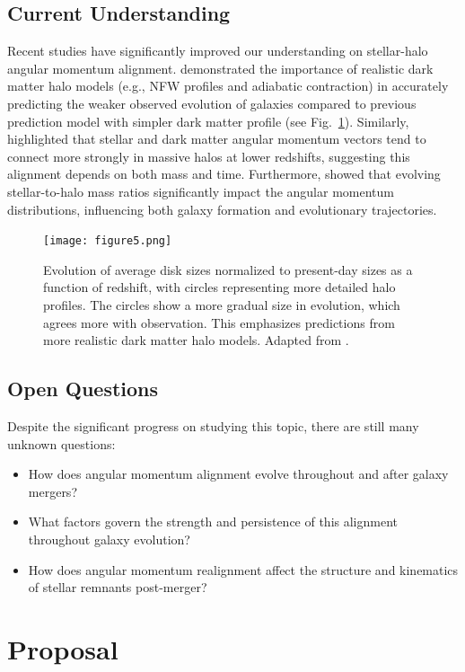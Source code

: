 \documentclass[twocolumn]{aastex631}
\begin{document}
\subsection{Current Understanding}
Recent studies have significantly improved our understanding on stellar-halo angular momentum alignment. \cite{Somerville2008} demonstrated the importance of realistic dark matter halo models (e.g., NFW profiles and adiabatic contraction) in accurately predicting the weaker observed evolution of galaxies compared to previous prediction model with simpler dark matter profile (see Fig.~\ref{fig:somerville_fig5}). Similarly, \cite{Chua2019} highlighted that stellar and dark matter angular momentum vectors tend to connect more strongly in massive halos at lower redshifts, suggesting this alignment depends on both mass and time. Furthermore, \cite{Baptista2023} showed that evolving stellar-to-halo mass ratios significantly impact the angular momentum distributions, influencing both galaxy formation and evolutionary trajectories.

\begin{figure}[ht!]
    \centering
    \texttt{[image: figure5.png]}
    \caption{Evolution of average disk sizes normalized to present-day sizes as a function of redshift, with circles representing more detailed halo profiles. The circles show a more gradual size in evolution, which agrees more with observation. This emphasizes predictions from more realistic dark matter halo models. Adapted from \cite{Somerville2008}.}
    \label{fig:somerville_fig5}
\end{figure}

\subsection{Open Questions}
Despite the significant progress on studying this topic, there are still many unknown questions:
\begin{itemize}
    \item How does angular momentum alignment evolve throughout and after galaxy mergers?
    \item What factors govern the strength and persistence of this alignment throughout galaxy evolution?
    \item How does angular momentum realignment affect the structure and kinematics of stellar remnants post-merger?
\end{itemize}

\section{Proposal}
\end{document}
